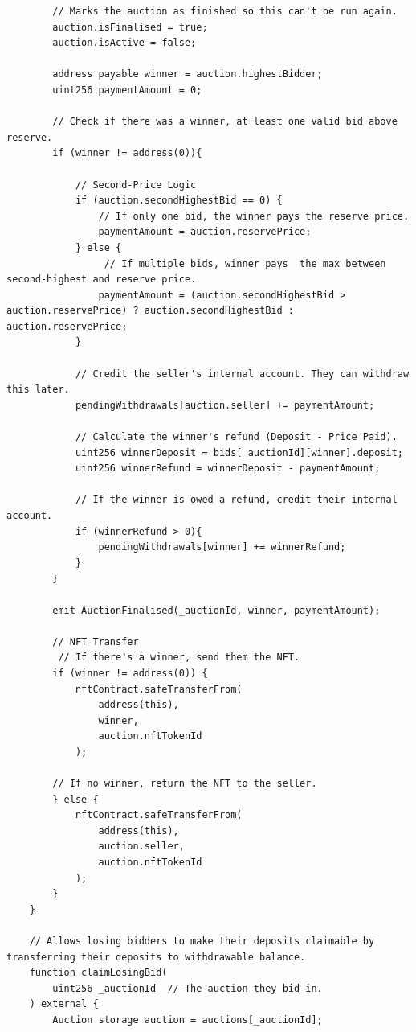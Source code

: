 \documentclass[11pt, a4paper]{article}
\begin{document}
\begin{lstlisting}
        // Marks the auction as finished so this can't be run again.
        auction.isFinalised = true;
        auction.isActive = false;

        address payable winner = auction.highestBidder;
        uint256 paymentAmount = 0;

        // Check if there was a winner, at least one valid bid above reserve.
        if (winner != address(0)){

            // Second-Price Logic
            if (auction.secondHighestBid == 0) {
                // If only one bid, the winner pays the reserve price.
                paymentAmount = auction.reservePrice;
            } else {
                 // If multiple bids, winner pays  the max between second-highest and reserve price.
                paymentAmount = (auction.secondHighestBid > auction.reservePrice) ? auction.secondHighestBid : auction.reservePrice;
            }

            // Credit the seller's internal account. They can withdraw this later.
            pendingWithdrawals[auction.seller] += paymentAmount;

            // Calculate the winner's refund (Deposit - Price Paid).
            uint256 winnerDeposit = bids[_auctionId][winner].deposit;
            uint256 winnerRefund = winnerDeposit - paymentAmount;

            // If the winner is owed a refund, credit their internal account.
            if (winnerRefund > 0){
                pendingWithdrawals[winner] += winnerRefund;
            }
        }

        emit AuctionFinalised(_auctionId, winner, paymentAmount); 

        // NFT Transfer
         // If there's a winner, send them the NFT.
        if (winner != address(0)) {
            nftContract.safeTransferFrom(
                address(this),
                winner,
                auction.nftTokenId
            );
        
        // If no winner, return the NFT to the seller.
        } else {
            nftContract.safeTransferFrom(
                address(this),
                auction.seller,
                auction.nftTokenId
            );
        }        
    }

    // Allows losing bidders to make their deposits claimable by transferring their deposits to withdrawable balance.
    function claimLosingBid(
        uint256 _auctionId  // The auction they bid in.
    ) external {
        Auction storage auction = auctions[_auctionId];


\end{lstlisting}
\end{document}
